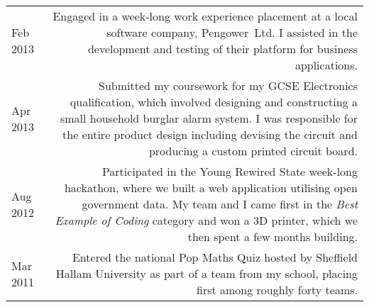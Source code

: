 \begin{longtable}{L!{\sep}R}

    Feb 2013 &
    Engaged in a week-long work experience placement at a local software company, \mbox{Pengower Ltd}. I assisted in the development and testing of their platform for business applications.
    \vspace{1.2em} \\

    Apr 2013 &
    Submitted my coursework for my GCSE Electronics qualification, which involved designing and constructing a small household burglar alarm system. I was responsible for the entire product design including devising the circuit and producing a custom printed circuit board.
    \vspace{1.2em} \\

    Aug 2012 &
    Participated in the Young Rewired State week-long hackathon, where we built a web application utilising open government data. My team and I came first in the \emph{Best Example of Coding} category and won a 3D printer, which we then spent a few months building.
    \vspace{1.2em} \\


    Mar 2011 &
    Entered the national Pop Maths Quiz hosted by Sheffield Hallam University as part of a team from my school, placing first among roughly forty teams.
    \\
\end{longtable}

\vspace{.2em}
